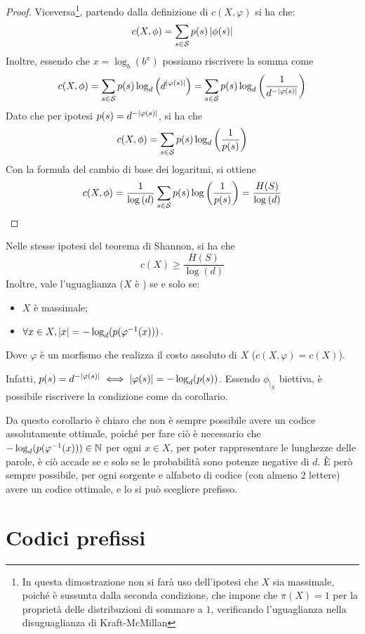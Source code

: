 \begin{proof}
  Viceversa\footnote{In questa dimostrazione non si farà uso dell'ipotesi che \(X\) sia massimale, poiché è sussunta dalla seconda condizione, che impone che \(\pi(X) = 1\) per la proprietà delle distribuzioni di sommare a \(1\), verificando l'uguaglianza nella disuguaglianza di Kraft-McMillan}, partendo dalla definizione di \(c(X,\varphi)\) si ha che:
  \[c(X,\phi) = \sum_{s \in \mathcal{S}} p(s)\left|\phi(s)\right|\]
  Inoltre, essendo che \(x = \log_{b}(b^x)\) possiamo riscrivere la somma come
  \[c(X,\phi) = \sum_{s \in \mathcal{S}} p(s)\log_{d}\left(d^{\left|\varphi(s)\right|}\right) =\sum_{s \in \mathcal{S}} p(s)\log_{d}\left(\frac{1}{d^{-\left|\varphi(s)\right|}}\right) \]
  Dato che per ipotesi \(p(s) = d^{-\left|\varphi(s)\right|}\), si ha che
  \[c(X,\phi) = \sum_{s \in \mathcal{S}} p(s)\log_{d}\left(\frac{1}{p(s)}\right) \]
  Con la formula del cambio di base dei logaritmi, si ottiene
  \[c(X,\phi) = \frac{1}{\log\left(d\right)} \sum_{s \in \mathcal{S}} p(s)\log\left(\frac{1}{p(s)}\right) = \frac{H(S)}{\log\left(d\right)}\]
\end{proof}

\begin{corollary}{}
  Nelle stesse ipotesi del teorema di Shannon, si ha che
  \[c(X) \geq \frac{H(S)}{\log(d)}\]
  Inoltre, vale l'uguaglianza (\(X\) è ) se e solo se:
  \begin{itemize}
    \item \(X\) è massimale;
    \item \(\forall x \in X, \left|x\right| = -\log_d (p(\varphi^{-1}(x)))\).
  \end{itemize}
  Dove \(\varphi\) è un morfismo che realizza il costo assoluto di \(X\) (\(c(X,\varphi) = c(X)\)).
\end{corollary}
Infatti, \(p(s) = d^{-\left|\varphi(s)\right|} \iff \left|\varphi(s)\right| = -\log_d(p(s))\). Essendo \(\phi_{|_X}\) biettiva, è possibile riscrivere la condizione come da corollario.

Da questo corollario è chiaro che non è sempre possibile avere un codice assolutamente ottimale, poiché per fare ciò è necessario che \(-\log_d (p(\varphi^{-1}(x))) \in \mathbb{N}\) per ogni \(x \in X\), per poter rappresentare le lunghezze delle parole, è ciò accade se e solo se le probabilità sono potenze negative di \(d\).
È però sempre possibile, per ogni sorgente e alfabeto di codice (con almeno \(2\) lettere) avere un codice ottimale, e lo si può scegliere prefisso.

\section{Codici prefissi}

